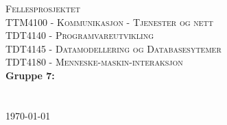 \begin{titlepage}
\begin{center} 

\vspace*{3cm}
\textsc{\Huge Fellesprosjektet}\\[0.7cm]
\textsc{\medium TTM4100 - Kommunikasjon - Tjenester og nett}\\[0.3cm]
\textsc{\medium TDT4140 - Programvareutvikling}\\[0.3cm]
\textsc{\medium TDT4145 - Datamodellering og Databasesytemer}\\[0.3cm]
\textsc{\medium TDT4180 - Menneske-maskin-interaksjon}\\[0.3cm]

\textbf{\Large Gruppe 7:} \\[0.2cm]
 \\
\\[1cm] 

\today

\end{center}
\end{titlepage}

